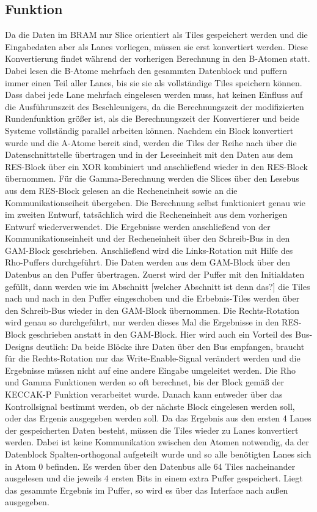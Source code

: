 \subsection{Funktion}
Da die Daten im BRAM nur Slice orientiert als Tiles gespeichert werden und die Eingabedaten aber als Lanes vorliegen, müssen sie erst konvertiert werden.
Diese Konvertierung findet während der vorherigen Berechnung in den B-Atomen statt.
Dabei lesen die B-Atome mehrfach den gesammten Datenblock und puffern immer einen Teil aller Lanes, bis sie sie als vollständige Tiles speichern können.
Dass dabei jede Lane mehrfach eingelesen werden muss, hat keinen Einfluss auf die Ausführunszeit des Beschleunigers, da die Berechnungszeit der modifizierten Rundenfunktion größer ist,
als die Berechnungszeit der Konvertierer und beide Systeme vollständig parallel arbeiten können.
Nachdem ein Block konvertiert wurde und die A-Atome bereit sind, werden die Tiles der Reihe nach über die Datenschnittstelle übertragen und in der Leseeinheit mit den Daten aus dem RES-Block
über ein XOR kombiniert und anschließend wieder in den RES-Block übernommen.
Für die Gamma-Berechnung werden die Slices über den Lesebus aus dem RES-Block gelesen an die Recheneinheit sowie an die Kommunikationseiheit übergeben.
Die Berechnung selbst funktioniert genau wie im zweiten Entwurf, tatsächlich wird die Recheneinheit aus dem vorherigen Entwurf wiederverwendet.
Die Ergebnisse werden anschließend von der Kommunikationseinheit und der Recheneinheit über den Schreib-Bus in den GAM-Block geschrieben.
Anschließend wird die Links-Rotation mit Hilfe des Rho-Puffers durchgeführt. Die Daten werden aus dem GAM-Block über den Datenbus an den Puffer übertragen.
Zuerst wird der Puffer mit den Initialdaten gefüllt, dann werden wie im Abschnitt [welcher Abschnitt ist denn das?] die Tiles nach und nach in den Puffer eingeschoben
und die Erbebnis-Tiles werden über den Schreib-Bus wieder in den GAM-Block übernommen.
Die Rechts-Rotation wird genau so durchgeführt, nur werden dieses Mal die Ergebnisse in den RES-Block geschrieben anstatt in den GAM-Block.
Hier wird auch ein Vorteil des Bus-Designs deutlich: Da beide Blöcke ihre Daten über den Bus empfangen, braucht für die Rechts-Rotation nur das
Write-Enable-Signal verändert werden und die Ergebnisse müssen nicht auf eine andere Eingabe umgeleitet werden.
Die Rho und Gamma Funktionen werden so oft berechnet, bis der Block gemäß der KECCAK-P Funktion verarbeitet wurde.
Danach kann entweder über das Kontrollsignal bestimmt werden, ob der nächste Block eingelesen werden soll, oder das Ergenis ausgegeben werden soll.
Da das Ergebnis aus den ersten 4 Lanes der gespeicherten Daten besteht, müssen die Tiles wieder zu Lanes konvertiert werden.
Dabei ist keine Kommunikation zwischen den Atomen notwendig, da der Datenblock Spalten-orthogonal aufgeteilt wurde und so alle benötigten Lanes sich in Atom 0 befinden.
Es werden über den Datenbus alle 64 Tiles nacheinander ausgelesen und die jeweils 4 ersten Bits in einem extra Puffer gespeichert.
Liegt das gesammte Ergebnis im Puffer, so wird es über das Interface nach außen ausgegeben.

